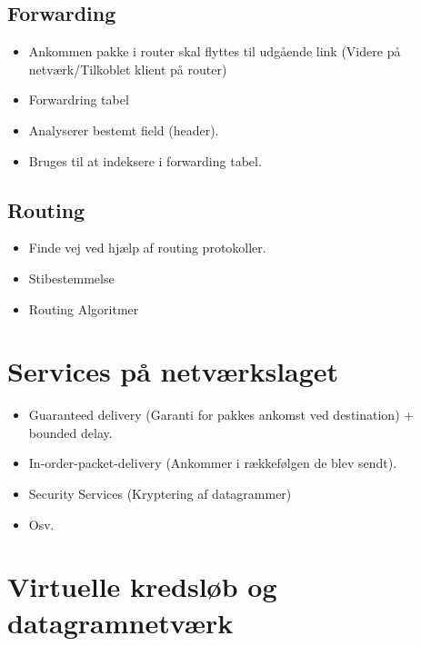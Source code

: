 \subsection{Forwarding}
\begin{itemize}
\item Ankommen pakke i router skal flyttes til udgående link (Videre på netværk/Tilkoblet klient på router)
\item Forwardring tabel
\item Analyserer bestemt field (header).
\item Bruges til at indeksere i forwarding tabel.
\end{itemize}

\subsection{Routing}
\begin{itemize}
\item Finde vej ved hjælp af routing protokoller.
\item Stibestemmelse
\item Routing Algoritmer
\end{itemize}

\section{Services på netværkslaget}
\begin{itemize}
\item Guaranteed delivery (Garanti for pakkes ankomst ved destination) + bounded delay.
\item In-order-packet-delivery (Ankommer i rækkefølgen de blev sendt).
\item Security Services (Kryptering af datagrammer)
\item Osv.
\end{itemize}

\section{Virtuelle kredsløb og datagramnetværk}
